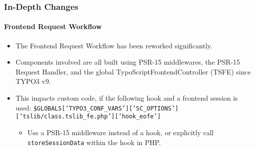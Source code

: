 \begin{frame}[fragile]
	\frametitle{In-Depth Changes}
	\framesubtitle{Frontend Request Workflow}

	\lstset{basicstyle=\smaller\ttfamily}

	\begin{itemize}
		\item The Frontend Request Workflow has been reworked significantly.

		\item Components involved are all built using PSR-15 middlewares, the PSR-15 Request Handler,
			and the global TypoScriptFrontendController (TSFE) since TYPO3 v9.

		\item This impacts custom code, if the following hook and a frontend session is used:\newline
			{\fontsize{7}{8}\selectfont\texttt{\$GLOBALS['TYPO3\_CONF\_VARS']['SC\_OPTIONS']['tslib/class.tslib\_fe.php']['hook\_eofe']}}

			\begin{itemize}\smaller
				\item[\ding{228}] Use a PSR-15 middleware instead of a hook, or explicitly call \texttt{storeSessionData}
				within the hook in PHP.
			\end{itemize}\normalsize

	\end{itemize}

\end{frame}


